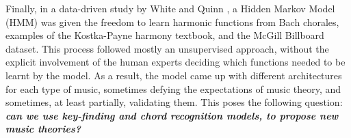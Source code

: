 Finally, in a data-driven study by White and Quinn \cite{white2018chord}, a Hidden Markov Model (HMM) was given the freedom to learn harmonic functions from Bach chorales, examples of the Kostka-Payne harmony textbook, and the McGill Billboard dataset. This process followed mostly an unsupervised approach, without the explicit involvement of the human experts deciding which functions needed to be learnt by the model. As a result, the model came up with different architectures for each type of music, sometimes defying the expectations of music theory, and sometimes, at least partially, validating them. This poses the following question: \textbf{\emph{can we use key-finding and chord recognition models, to propose new music theories?}}


